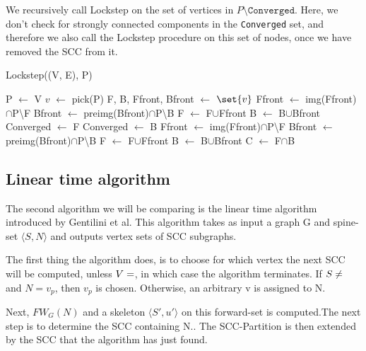 \documentclass[../master/master.tex]{subfiles}
\newcommand{\FW}[2][G]{\ensuremath{FW_{#1}(#2)}}
\newcommand{\pair}[2]{\ensuremath{\langle #1, #2\rangle}}
\newcommand*\Let[2]{\State #1 $\gets$ #2}
\begin{document}
We recursively call Lockstep on the set of vertices in $P\setminus \texttt{Converged}$. Here, we don't check for strongly connected components in the \texttt{Converged} set, and therefore we also call the Lockstep procedure on this set of nodes, once we have removed the SCC from it.
\begin{algorithm}
  \caption{Lockstep((V, E), P)}
  \begin{algorithmic}[1]
    \Let{P}{V}
    \Statex
    \State \Return
    \EndIf
    \Statex
      \Let{$v$}{pick(P)}
      \Let{F, B, Ffront, Bfront}{$\set{v}$}
      \Statex
      \Let{Ffront}{img(Ffront)$\cap$P\textbackslash F}
      \Let{Bfront}{preimg(Bfront)$\cap$P\textbackslash B}
      \Let{F}{F$\cup$Ffront}
       \Let{B}{B$\cup$Bfront}
       \EndWhile
       \Statex
        \Let{Converged}{F}
        \Else
        \Let{Converged}{B}
          \EndIf
      \Statex
       \Let{Ffront}{img(Ffront)$\cap$P\textbackslash F}
       \Let{Bfront}{preimg(Bfront)$\cap$P\textbackslash B}
       \Let{F}{F$\cup$Ffront}
       \Let{B}{B$\cup$Bfront}
       \EndWhile
       \Statex
       \Let{C}{F$\cap$B}
  \end{algorithmic}
\end{algorithm}
\subsection{Linear time algorithm}
The second algorithm we will be comparing is the linear time algorithm \cite{linear} introduced by Gentilini et al. This algorithm takes as input a graph G and spine-set $\langle S, N\rangle$ and outputs vertex sets of SCC subgraphs.

The first thing the algorithm does, is to choose for which vertex the next SCC will be computed, unless $V=\empty$, in which case the algorithm terminates. If $S\neq\empty$ and $N={v_p}$, then $v_p$ is chosen. Otherwise, an arbitrary v is assigned to N.

Next, \FW{N} and a skeleton \pair{S'}{u'} on this forward-set is computed.The next step is to determine the SCC containing N.. The SCC-Partition is then extended by the SCC that the algorithm has just found. 
\end{document}
